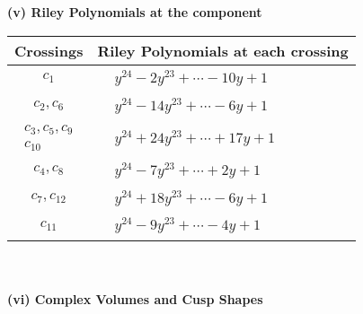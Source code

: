 \documentclass[1p]{elsarticle_modified}
\theoremstyle{definition}
\begin{document}
\newpage\renewcommand{\arraystretch}{1}
\flushleft \textbf{(v) Riley Polynomials at the component}\newline \\
\begin{tabular}{m{50pt}|m{274pt}}
Crossings & \hspace{64pt}Riley Polynomials at each crossing \\
\hline $$\begin{aligned}c_{1}\end{aligned}$$&$\begin{aligned}
&y^{24}-2 y^{23}+\cdots-10 y+1
\end{aligned}$\\
\hline $$\begin{aligned}c_{2},c_{6}\end{aligned}$$&$\begin{aligned}
&y^{24}-14 y^{23}+\cdots-6 y+1
\end{aligned}$\\
\hline $$\begin{aligned}c_{3},c_{5},c_{9}\\c_{10}\end{aligned}$$&$\begin{aligned}
&y^{24}+24 y^{23}+\cdots+17 y+1
\end{aligned}$\\
\hline $$\begin{aligned}c_{4},c_{8}\end{aligned}$$&$\begin{aligned}
&y^{24}-7 y^{23}+\cdots+2 y+1
\end{aligned}$\\
\hline $$\begin{aligned}c_{7},c_{12}\end{aligned}$$&$\begin{aligned}
&y^{24}+18 y^{23}+\cdots-6 y+1
\end{aligned}$\\
\hline $$\begin{aligned}c_{11}\end{aligned}$$&$\begin{aligned}
&y^{24}-9 y^{23}+\cdots-4 y+1
\end{aligned}$\\
\hline
\end{tabular}\\~\\
\newpage\flushleft \textbf{(vi) Complex Volumes and Cusp Shapes}
\end{document}

